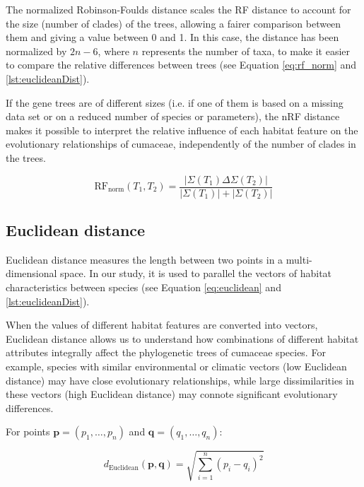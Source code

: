 The normalized Robinson-Foulds distance scales the RF distance to account for the size (number of clades) of the trees, allowing a fairer comparison between them and giving a value between 0 and 1. In this case, the distance has been normalized by $2n-6$, where $n$ represents the number of taxa, to make it easier to compare the relative differences between trees (see Equation \eqref{eq:rf_norm} and \autoref{lst:euclideanDist}).

If the gene trees are of different sizes (i.e. if one of them is based on a missing data set or on a reduced number of species or parameters), the nRF distance makes it possible to interpret the relative influence of each habitat feature on the evolutionary relationships of cumaceae, independently of the number of clades in the trees.

\begin{equation}\label{eq:rf_norm}
    \text{RF}_{\text{norm}}(T_1, T_2) = \frac{| \Sigma(T_1) \Delta \Sigma(T_2) |}{| \Sigma(T_1) | + | \Sigma(T_2) |}
\end{equation}

\subsection{Euclidean distance}\label{euclidean}

Euclidean distance measures the length between two points in a multi-dimensional space. In our study, it is used to parallel the vectors of habitat characteristics between species (see Equation \eqref{eq:euclidean} and \autoref{lst:euclideanDist}).

When the values of different habitat features are converted into vectors, Euclidean distance allows us to understand how combinations of different habitat attributes integrally affect the phylogenetic trees of cumaceae species. For example, species with similar environmental or climatic vectors (low Euclidean distance) may have close evolutionary relationships, while large dissimilarities in these vectors (high Euclidean distance) may connote significant evolutionary differences.

For points $\mathbf{p} = (p_1, \ldots, p_n)$ and $\mathbf{q} = (q_1, \ldots, q_n)$:

\begin{equation}\label{eq:euclidean}
    d_{\text{Euclidean}}(\mathbf{p}, \mathbf{q}) = \sqrt{\sum_{i=1}^{n} (p_i - q_i)^2}
\end{equation}

